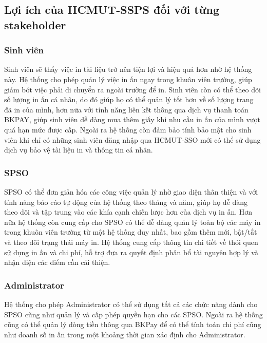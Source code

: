\subsection{Lợi ích của HCMUT-SSPS đối với từng stakeholder}
\subsubsection{Sinh viên}
Sinh viên sẽ thấy việc in tài liệu trở nên tiện lợi và hiệu quả hơn nhờ hệ thống này. Hệ thống cho phép quản lý việc in ấn ngay trong khuân viên trường, giúp giảm bớt việc phải di chuyển ra ngoài trường để in. Sinh viên còn có thể theo dõi số lượng in ấn cá nhân, do đó giúp họ có thể quản lý tốt hơn về số lượng trang đã in của mình, hơn nữa với tính năng liên kết thông qua dịch vụ thanh toán BKPAY, giúp sinh viên dễ dàng mua thêm giấy khi nhu cầu in ấn của mình vượt quá hạn mức được cấp. Ngoài ra hệ thống còn đảm bảo tính bảo mật cho sinh viên khi chỉ có những sinh viên đăng nhập qua HCMUT-SSO mới có thể sử dụng dịch vụ bảo vệ tài liệu in và thông tin cá nhân.

\subsubsection{SPSO}
SPSO có thể đơn giản hóa các công việc quản lý nhờ giao diện thân thiện và với tính năng báo cáo tự động của hệ thống theo tháng và năm, giúp họ dễ dàng theo dõi và tập trung vào các khía cạnh chiến lược hơn của dịch vụ in ấn. Hơn nữa hệ thống còn cung cấp cho SPSO có thể dễ dàng quản lý toàn bộ các máy in trong khuôn viên trường từ một hệ thống duy nhất, bao gồm thêm mới, bật/tắt và theo dõi trạng thái máy in. Hệ thống cung cấp thông tin chi tiết về thói quen sử dụng in ấn và chi phí, hỗ trợ đưa ra quyết định phân bổ tài nguyên hợp lý và nhận diện các điểm cần cải thiện. %

\subsubsection{Administrator}
Hệ thống cho phép Administrator có thể sử dụng tất cả các chức năng dành cho SPSO cũng như quản lý và cấp phép quyền hạn cho các SPSO. Ngoài ra hệ thống cũng có thể quản lý dòng tiền thông qua BKPay để có thể tính toán chi phí cũng như doanh số in ấn trong một khoảng thời gian xác định cho Administrator.

